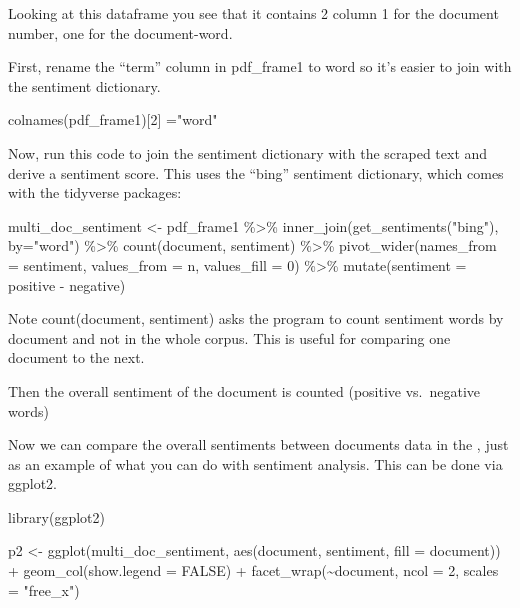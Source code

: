 \documentclass[
  letterpaper,
  DIV=11,
  numbers=noendperiod]{scrartcl}
\newenvironment{Shaded}{\begin{snugshade}}{\end{snugshade}}
\newcommand{\AttributeTok}[1]{\textcolor[rgb]{0.40,0.45,0.13}{#1}}
\newcommand{\ConstantTok}[1]{\textcolor[rgb]{0.56,0.35,0.01}{#1}}
\newcommand{\DecValTok}[1]{\textcolor[rgb]{0.68,0.00,0.00}{#1}}
\newcommand{\FunctionTok}[1]{\textcolor[rgb]{0.28,0.35,0.67}{#1}}
\newcommand{\NormalTok}[1]{\textcolor[rgb]{0.00,0.23,0.31}{#1}}
\newcommand{\OtherTok}[1]{\textcolor[rgb]{0.00,0.23,0.31}{#1}}
\newcommand{\SpecialCharTok}[1]{\textcolor[rgb]{0.37,0.37,0.37}{#1}}
\newcommand{\StringTok}[1]{\textcolor[rgb]{0.13,0.47,0.30}{#1}}
\begin{document}
Looking at this dataframe you see that it contains 2 column 1 for the
document number, one for the document-word.

First, rename the ``term'' column in pdf\_frame1 to word so it's easier
to join with the sentiment dictionary.

\begin{Shaded}
\begin{Highlighting}[]
\FunctionTok{colnames}\NormalTok{(pdf\_frame1)[}\DecValTok{2}\NormalTok{] }\OtherTok{=}\StringTok{"word"}
\end{Highlighting}
\end{Shaded}

Now, run this code to join the sentiment dictionary with the scraped
text and derive a sentiment score. This uses the ``bing'' sentiment
dictionary, which comes with the tidyverse packages:

\begin{Shaded}
\begin{Highlighting}[]
\NormalTok{multi\_doc\_sentiment }\OtherTok{\textless{}{-}}\NormalTok{ pdf\_frame1 }\SpecialCharTok{\%\textgreater{}\%}
  \FunctionTok{inner\_join}\NormalTok{(}\FunctionTok{get\_sentiments}\NormalTok{(}\StringTok{"bing"}\NormalTok{), }\AttributeTok{by=}\StringTok{"word"}\NormalTok{) }\SpecialCharTok{\%\textgreater{}\%}
  \FunctionTok{count}\NormalTok{(document, sentiment) }\SpecialCharTok{\%\textgreater{}\%}
  \FunctionTok{pivot\_wider}\NormalTok{(}\AttributeTok{names\_from =}\NormalTok{ sentiment, }\AttributeTok{values\_from =}\NormalTok{ n, }\AttributeTok{values\_fill =} \DecValTok{0}\NormalTok{) }\SpecialCharTok{\%\textgreater{}\%} 
  \FunctionTok{mutate}\NormalTok{(}\AttributeTok{sentiment =}\NormalTok{ positive }\SpecialCharTok{{-}}\NormalTok{ negative)}
\end{Highlighting}
\end{Shaded}

Note count(document, sentiment) asks the program to count sentiment
words by document and not in the whole corpus. This is useful for
comparing one document to the next.

Then the overall sentiment of the document is counted (positive
vs.~negative words)

Now we can compare the overall sentiments between documents data in the
, just as an example of what you can do with sentiment analysis. This
can be done via ggplot2.

\begin{Shaded}
\begin{Highlighting}[]
\FunctionTok{library}\NormalTok{(ggplot2)}

\NormalTok{p2 }\OtherTok{\textless{}{-}} \FunctionTok{ggplot}\NormalTok{(multi\_doc\_sentiment, }\FunctionTok{aes}\NormalTok{(document, sentiment, }\AttributeTok{fill =}\NormalTok{ document)) }\SpecialCharTok{+}
  \FunctionTok{geom\_col}\NormalTok{(}\AttributeTok{show.legend =} \ConstantTok{FALSE}\NormalTok{) }\SpecialCharTok{+}
  \FunctionTok{facet\_wrap}\NormalTok{(}\SpecialCharTok{\textasciitilde{}}\NormalTok{document, }\AttributeTok{ncol =} \DecValTok{2}\NormalTok{, }\AttributeTok{scales =} \StringTok{"free\_x"}\NormalTok{)}
\end{Highlighting}
\end{Shaded}
\end{document}
